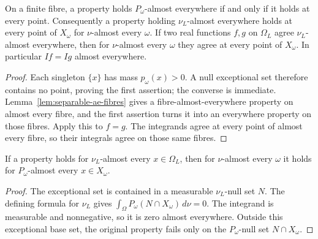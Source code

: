 \begin{lemma}\label{lem:finite-fibre-ae}
\leanok
{}
On a finite fibre, a property holds $P_\omega$-almost everywhere if
and only if it holds at every point. Consequently a property holding
$\nu_L$-almost everywhere holds at every point of $X_\omega$ for
$\nu$-almost every $\omega$.
If two real functions $f,g$ on $\Omega_L$ agree $\nu_L$-almost everywhere,
then for $\nu$-almost every $\omega$ they agree at every point of
$X_\omega$. In particular $If=Ig$ almost everywhere.
\end{lemma}
\begin{proof}
Each singleton $\{x\}$ has mass $p_\omega(x)>0$. A null exceptional
set therefore contains no point, proving the first assertion; the
converse is immediate. Lemma~\ref{lem:separable-ae-fibres} gives a
fibre-almost-everywhere property on almost every fibre, and the first
assertion turns it into an everywhere property on those fibres.
Apply this to $f=g$. The integrands agree at every point of almost
every fibre, so their integrals agree on those same fibres.
\end{proof}

\begin{lemma}\label{lem:separable-ae-fibres}
\leanok
{}
If a property holds for $\nu_L$-almost every $x\in\Omega_L$, then
for $\nu$-almost every $\omega$ it holds for $P_\omega$-almost every
$x\in X_\omega$.
\end{lemma}
\begin{proof}
The exceptional set is contained in a measurable $\nu_L$-null set $N$.
The defining formula for $\nu_L$ gives
$\int_\Omega P_\omega(N\cap X_\omega)\,d\nu=0$.
The integrand is measurable and nonnegative, so it is zero almost
everywhere. Outside this exceptional base set, the original property
fails only on the $P_\omega$-null set $N\cap X_\omega$.
\end{proof}

